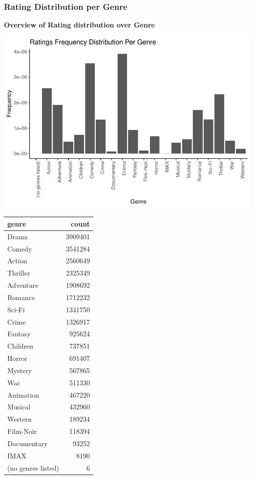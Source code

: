 \documentclass[]{article}
\begin{document}
\hypertarget{rating-distribution-per-genre}{%
\subsubsection{Rating Distribution per
Genre}\label{rating-distribution-per-genre}}

\textbf{Overview of Rating distribution over Genre}

\begin{center}\includegraphics{MovieLens_Project_Report_files/figure-latex/unnamed-chunk-26-1} \end{center}

\begin{table}[H]
\centering\begingroup\fontsize{10}{12}\selectfont

\begin{tabular}{l|r}
\hline
genre & count\\
\hline
Drama & 3909401\\
\hline
Comedy & 3541284\\
\hline
Action & 2560649\\
\hline
Thriller & 2325349\\
\hline
Adventure & 1908692\\
\hline
Romance & 1712232\\
\hline
Sci-Fi & 1341750\\
\hline
Crime & 1326917\\
\hline
Fantasy & 925624\\
\hline
Children & 737851\\
\hline
Horror & 691407\\
\hline
Mystery & 567865\\
\hline
War & 511330\\
\hline
Animation & 467220\\
\hline
Musical & 432960\\
\hline
Western & 189234\\
\hline
Film-Noir & 118394\\
\hline
Documentary & 93252\\
\hline
IMAX & 8190\\
\hline
(no genres listed) & 6\\
\hline
\end{tabular}
\endgroup{}
\end{table}
\end{document}
